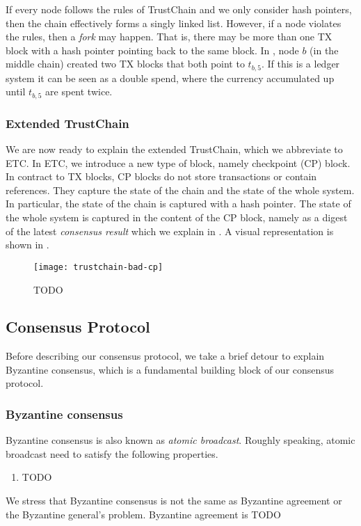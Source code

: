 If every node follows the rules of TrustChain and we only consider hash pointers,
then the chain effectively forms a singly linked list.
However, if a node violates the rules, then a \emph{fork} may happen.
That is, there may be more than one TX block with a hash pointer pointing back to the same block.
In , node $b$ (in the middle chain) created two TX blocks that both point to $t_{b, 5}$.
If this is a ledger system it can be seen as a double spend, where the currency accumulated up until $t_{b, 5}$ are spent twice.

\subsubsection*{Extended TrustChain}
We are now ready to explain the extended TrustChain, which we abbreviate to ETC.
In ETC, we introduce a new type of block, namely checkpoint (CP) block.
In contract to TX blocks, CP blocks do not store transactions or contain references.
They capture the state of the chain and the state of the whole system.
In particular, the state of the chain is captured with a hash pointer.
The state of the whole system is captured in the content of the CP block,
namely as a digest of the latest \emph{consensus result} which we explain in .
A visual representation is shown in .
\begin{figure}
    \texttt{[image: trustchain-bad-cp]}
    \centering
    \caption{TODO}
    \label{fig:trustchain-bad-cp}
\end{figure}

\subsection{Consensus Protocol}\label{sec:overview-cons}
Before describing our consensus protocol, we take a brief detour to explain Byzantine consensus,
which is a fundamental building block of our consensus protocol.

\subsubsection*{Byzantine consensus}
Byzantine consensus is also known as \emph{atomic broadcast}.
Roughly speaking, atomic broadcast need to satisfy the following properties.
\begin{enumerate}
\item TODO
\end{enumerate}
We stress that Byzantine consensus is not the same as Byzantine agreement or the Byzantine general's problem.
Byzantine agreement is TODO

